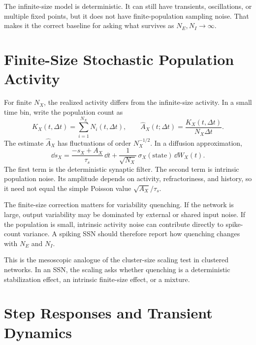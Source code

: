The infinite-size model is deterministic. It can still have transients, oscillations, or multiple fixed points, but it does not have finite-population sampling noise. That makes it the correct baseline for asking what survives as $N_E,N_I\to\infty$.

\section{Finite-Size Stochastic Population Activity}
\label{sec:spiking-ssn-finite-size-population-activity}

For finite $N_X$, the realized activity differs from the infinite-size activity. In a small time bin, write the population count as
%
\begin{equation}
  K_X(t,\Delta t)
  =
  \sum_{i=1}^{N_X}
  N_i(t,\Delta t),
  \qquad
  \widehat A_X(t;\Delta t)
  =
  \frac{K_X(t,\Delta t)}{N_X\Delta t}.
  \label{eq:gif-finite-pop-activity}
\end{equation}
%
The estimate $\widehat A_X$ has fluctuations of order $N_X^{-1/2}$. In a diffusion approximation,
%
\begin{equation}
  \dd s_X
  =
  \frac{-s_X+A_X}{\tau_s}\,\dd t
  +
  \frac{1}{\sqrt{N_X}}\,
  \sigma_X(\text{state})\,\dd W_X(t).
  \label{eq:gif-finite-size-synaptic-sde}
\end{equation}
%
The first term is the deterministic synaptic filter. The second term is intrinsic population noise. Its amplitude depends on activity, refractoriness, and history, so it need not equal the simple Poisson value $\sqrt{A_X}/\tau_s$.

The finite-size correction matters for variability quenching. If the network is large, output variability may be dominated by external or shared input noise. If the population is small, intrinsic activity noise can contribute directly to spike-count variance. A spiking SSN should therefore report how quenching changes with $N_E$ and $N_I$.

This is the mesoscopic analogue of the cluster-size scaling test in clustered networks. In an SSN, the scaling asks whether quenching is a deterministic stabilization effect, an intrinsic finite-size effect, or a mixture.

\section{Step Responses and Transient Dynamics}
\label{sec:spiking-ssn-step-responses-transient-dynamics}

